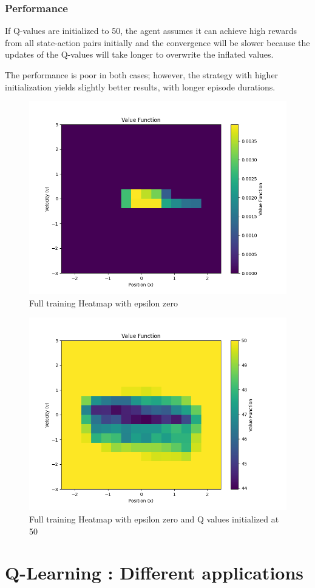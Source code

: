 \documentclass{article}
\begin{document}
\subsubsection{Performance}
If Q-values are initialized to 50, the agent assumes it can achieve high rewards from all state-action pairs initially and the convergence will be slower because the updates of the Q-values will take longer to overwrite the inflated values.

The performance is poor in both cases; however, the strategy with higher initialization yields slightly better results, with longer episode durations. 

\begin{figure}[h]
	\centering
	\includegraphics[width=0.5\linewidth]{../data/plot/heatmap_full_training_zero_epsilon.png}
	\caption{Full training Heatmap with epsilon zero}
	\label{fig:heatmap_zero}
\end{figure}

\begin{figure}[h]
	\centering
	\includegraphics[width=0.5\linewidth]{../data/plot/heatmap_full_training_zero_epsilon_fifty_initial.png}
	\caption{Full training Heatmap with epsilon zero and Q values initialized at 50}
	\label{fig:heatmap_zero}
\end{figure}

\newpage

\section{Q-Learning : Different applications}
\end{document}
